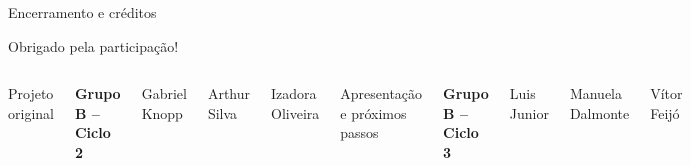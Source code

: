 \documentclass[aspectratio=169,11pt]{beamer}
\begin{document}
\begin{frame}{Encerramento e créditos}
  \centering
  {\large Obrigado pela participação!\par}
  \vspace{9mm}
  \begin{columns}[T,onlytextwidth]
    \centering
    {\large\color{blue}Projeto original\par}
    \vspace{2mm}
    \textbf{Grupo B -- Ciclo 2}\par
    \vspace{4mm}
    Gabriel Knopp\par
    Arthur Silva\par
    Izadora Oliveira
    \centering
    {\large\color{blue}Apresentação e próximos passos\par}
    \vspace{2mm}
    \textbf{Grupo B -- Ciclo 3}\par
    \vspace{4mm}
    Luis Junior\par
    Manuela Dalmonte\par
    Vítor Feijó
  \end{columns}
\end{frame}
\end{document}
